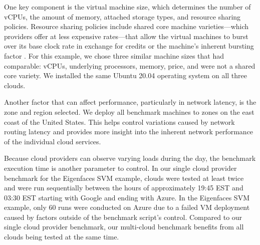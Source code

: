 One key component is the virtual machine size, which determines the
number of vCPUs, the amount of memory, attached storage types, and
resource sharing policies. Resource sharing policies include shared
core machine varieties—which providers offer at less expensive rates—that allow the virtual machines to burst over its base clock rate in
exchange for credits or the machine's inherent bursting factor
\cite{amazon-instances,google-instances}. For this example, we chose
three similar machine sizes that had comparable: vCPUs, underlying processors, memory, price, and were not a shared core variety. We installed the same Ubuntu 20.04 operating system on all
three clouds.

Another factor that can affect performance, particularly in network
latency, is the zone and region selected. We deploy all benchmark
machines to zones on the east coast of the United States. This helps
control variations caused by network routing latency and provides more
insight into the inherent network performance of the individual cloud
services.


Because cloud providers can observe varying loads during the day, the benchmark execution time is another parameter to control. In our single cloud provider benchmark for the Eigenfaces SVM example, clouds were tested at least twice and were run sequentially between the hours of approximately 19:45 EST and 03:30 EST starting with Google and ending with Azure. In the Eigenfaces SVM example, only 60 runs were
conducted on Azure due to a failed VM deployment caused by factors outside of the benchmark script's control. Compared to our single cloud provider benchmark, our multi-cloud benchmark benefits from all clouds being tested at the same time.

